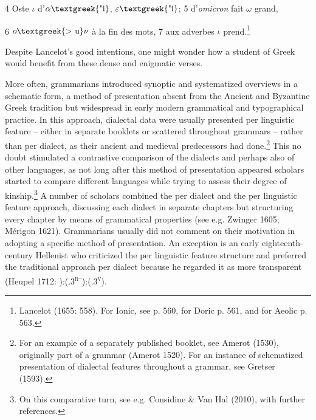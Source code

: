 \begin{styleQuote}
4 Oste $\iota $ d’$\alpha \text{\textgreek{"i}}$, $\varepsilon \text{\textgreek{"i}}$; 5 d’\textit{omicron} fait $\omega $ grand,
\end{styleQuote}

\begin{styleQuote}
6 $o\text{\textgreek{>~u}}\nu $ à la fin des mots, 7 aux adverbes $\iota $ prend.\footnote{ Lancelot (1655: 558). For Ionic, see p. 560, for Doric p. 561, and for Aeolic p. 563.}
\end{styleQuote}

\begin{styleStandard}
Despite Lancelot’s good intentions, one might wonder how a student of Greek would benefit from these dense and enigmatic verses.
\end{styleStandard}

\begin{styleStandard}
More often, grammarians introduced synoptic and systematized overviews in a schematic form, a method of presentation absent from the Ancient and Byzantine Greek tradition but widespread in early modern grammatical and typographical practice. In this approach, dialectal data were usually presented per linguistic feature – either in separate booklets or scattered throughout grammars – rather than per dialect, as their ancient and medieval predecessors had done.\footnote{ For an example of a separately published booklet, see Amerot (1530), originally part of a grammar (Amerot 1520). For an instance of schematized presentation of dialectal features throughout a grammar, see Gretser (1593).} This no doubt stimulated a contrastive comparison of the dialects and perhaps also of other languages, as not long after this method of presentation appeared scholars started to compare different languages while trying to assess their degree of kinship.\footnote{ On this comparative turn, see e.g. Considine \& Van Hal (2010), with further references.} A number of scholars combined the per dialect and the per linguistic feature approach, discussing each dialect in separate chapters but structuring every chapter by means of grammatical properties (see e.g. Zwinger 1605; Mérigon 1621). Grammarians usually did not comment on their motivation in adopting a specific method of presentation. An exception is an early eighteenth-century Hellenist who criticized the per linguistic feature structure and preferred the traditional approach per dialect because he regarded it as more transparent (Heupel 1712: ):(.3\textsc{\textsuperscript{r–}}):(.3\textsc{\textsuperscript{v}}).
\end{styleStandard}

